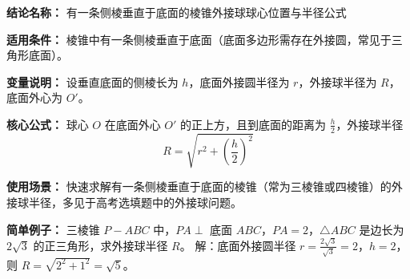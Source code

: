 \textbf{结论名称：} 有一条侧棱垂直于底面的棱锥外接球球心位置与半径公式

\textbf{适用条件：} 棱锥中有一条侧棱垂直于底面（底面多边形需存在外接圆，常见于三角形底面）。

\textbf{变量说明：} 设垂直底面的侧棱长为 \(h\)，底面外接圆半径为 \(r\)，外接球半径为 \(R\)，底面外心为 \(O'\)。

\textbf{核心公式：} 球心 \(O\) 在底面外心 \(O'\) 的正上方，且到底面的距离为 \(\frac{h}{2}\)，外接球半径
\[
\boxed{R = \sqrt{r^{2} + \left(\frac{h}{2}\right)^{2}}}
\]

\textbf{使用场景：} 快速求解有一条侧棱垂直于底面的棱锥（常为三棱锥或四棱锥）的外接球半径，多见于高考选填题中的外接球问题。

\textbf{简单例子：} 三棱锥 \(P-ABC\) 中，\(PA \perp\) 底面 \(ABC\)，\(PA = 2\)，\(\triangle ABC\) 是边长为 \(2\sqrt{3}\) 的正三角形，求外接球半径 \(R\)。
解：底面外接圆半径 \(r = \frac{2\sqrt{3}}{\sqrt{3}} = 2\)，\(h = 2\)，则
\(R = \sqrt{2^{2} + 1^{2}} = \sqrt{5}\)。